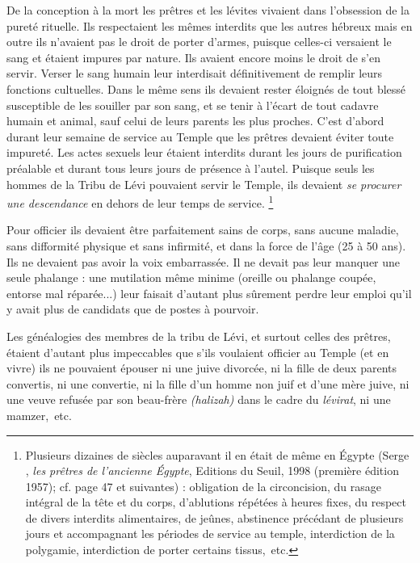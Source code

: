  De la conception à la mort les prêtres et les lévites vivaient dans l'obsession de la pureté rituelle. Ils respectaient les mêmes interdits que les autres hébreux mais en outre ils n'avaient pas le droit de porter d'armes, puisque celles-ci versaient le sang et étaient impures par nature. Ils avaient encore moins le droit de s'en servir. Verser le sang humain leur interdisait définitivement de remplir leurs fonctions cultuelles. Dans le même sens ils devaient rester éloignés de tout blessé susceptible de les souiller par son sang, et se tenir à l'écart de tout cadavre humain et animal, sauf celui de leurs parents les plus proches. C'est d'abord durant leur semaine de service au Temple que les prêtres devaient éviter toute impureté. Les actes sexuels leur étaient interdits durant les jours de purification préalable et durant tous leurs jours de présence à l'autel. Puisque seuls les hommes de la Tribu de Lévi pouvaient servir le Temple, ils devaient \emph{se procurer une descendance} en dehors de leur temps de service. \footnote{Plusieurs dizaines de siècles auparavant il en était de même en Égypte (Serge , \emph{les prêtres de l'ancienne Égypte}, Editions du Seuil, 1998 (première édition 1957); cf. page 47 et suivantes) : obligation de la circoncision, du rasage intégral de la tête et du corps, d'ablutions répétées à heures fixes, du respect de divers interdits alimentaires, de jeûnes, abstinence précédant de plusieurs jours et accompagnant les périodes de service au temple, interdiction de la polygamie, interdiction de porter certains tissus,~etc.} 
 
 Pour officier ils devaient être parfaitement sains de corps, sans aucune maladie, sans difformité physique et sans infirmité, et dans la force de l'âge (25 à 50 ans). Ils ne devaient pas avoir la voix embarrassée. Il ne devait pas leur manquer une seule phalange : une mutilation même minime (oreille ou phalange coupée, entorse mal réparée...) leur faisait d'autant plus sûrement perdre leur emploi qu'il y avait plus de candidats que de postes à pourvoir. 

 Les généalogies des membres de la tribu de Lévi, et surtout celles des prêtres, étaient d'autant plus impeccables que s'ils voulaient officier au Temple (et en vivre) ils ne pouvaient épouser ni une juive divorcée, ni la fille de deux parents convertis, ni une convertie, ni la fille d'un homme non juif et d'une mère juive, ni une veuve refusée par son beau-frère \emph{(halizah)} dans le cadre du \emph{lévirat}, ni une mamzer,~etc. 

